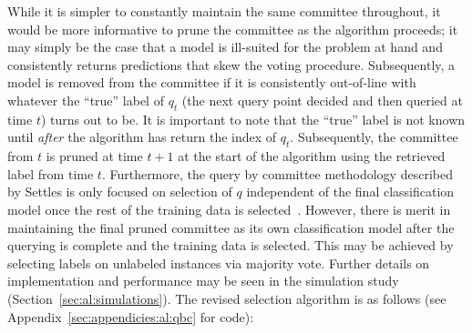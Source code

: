 \noindent While it is simpler to constantly maintain the same committee 
throughout, it would be more informative to prune the committee as the 
algorithm proceeds; it may simply be the case that a model is ill-suited for 
the problem at hand and consistently returns predictions that skew the voting 
procedure. Subsequently, a model is removed from the committee if it is 
consistently out-of-line with whatever the ``true'' label of $q_t$ (the next 
query point decided and then queried at time $t$) turns out to be. It is 
important to note that the ``true'' label is not known until \textit{after} the 
algorithm has return the index of $q_t$. Subsequently, the committee from $t$ 
is pruned at time $t+1$ at the start of the algorithm using the retrieved 
label from time $t$. 
Furthermore, the query by committee methodology described by Settles is only 
focused on selection of $q$ independent of the final classification model 
once the rest of the training data is selected~\cite{settles2010}. However, 
there is merit in maintaining the final pruned committee as its own 
classification model after the querying is complete and the training data is 
selected. This may be achieved by selecting labels on unlabeled instances via 
majority vote. Further details on implementation and performance may be seen in 
the simulation study (Section~\ref{sec:al:simulations}). The revised selection 
algorithm is as follows (see Appendix~\ref{sec:appendicies:al:qbc} for code):

